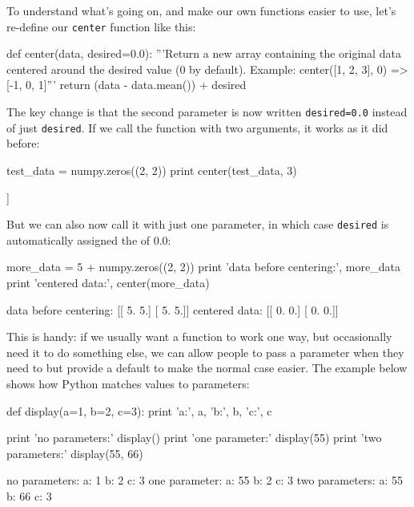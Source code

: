 To understand what's going on, and make our own functions easier to use,
let's re-define our \texttt{center} function like this:

\begin{VerbIn}
def center(data, desired=0.0):
    '''Return a new array containing the original data centered around the desired value (0 by default).
    Example: center([1, 2, 3], 0) => [-1, 0, 1]'''
    return (data - data.mean()) + desired
\end{VerbIn}

The key change is that the second parameter is now written
\texttt{desired=0.0} instead of just \texttt{desired}. If we call the
function with two arguments, it works as it did before:

\begin{VerbIn}
test_data = numpy.zeros((2, 2))
print center(test_data, 3)
\end{VerbIn}

\begin{VerbOut}
[[ 3.  3.]
 [ 3.  3.]]
\end{VerbOut}

But we can also now call it with just one parameter, in which case
\texttt{desired} is automatically assigned the
 of 0.0:

\begin{VerbIn}
more_data = 5 + numpy.zeros((2, 2))
print 'data before centering:', more_data
print 'centered data:', center(more_data)
\end{VerbIn}

\begin{VerbOut}
data before centering: [[ 5.  5.]
 [ 5.  5.]]
centered data: [[ 0.  0.]
 [ 0.  0.]]
\end{VerbOut}

This is handy: if we usually want a function to work one way, but
occasionally need it to do something else, we can allow people to pass a
parameter when they need to but provide a default to make the normal
case easier. The example below shows how Python matches values to
parameters:

\begin{VerbIn}
def display(a=1, b=2, c=3):
    print 'a:', a, 'b:', b, 'c:', c

print 'no parameters:'
display()
print 'one parameter:'
display(55)
print 'two parameters:'
display(55, 66)
\end{VerbIn}

\begin{VerbOut}
no parameters:
a: 1 b: 2 c: 3
one parameter:
a: 55 b: 2 c: 3
two parameters:
a: 55 b: 66 c: 3
\end{VerbOut}

